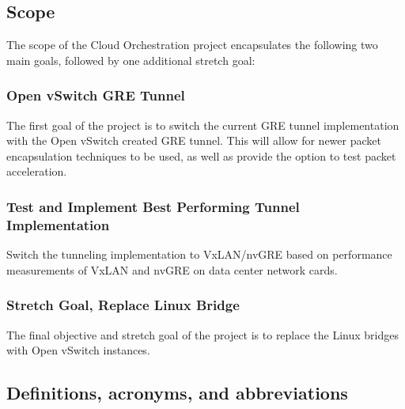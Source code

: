 \documentclass[10pt,letterpaper,onecolumn,draftclsnofoot]{IEEEtran}
\begin{document}
\subsection{Scope}

The scope of the Cloud Orchestration project encapsulates the following two main goals, followed
by one additional stretch goal:

\subsubsection{Open vSwitch GRE Tunnel}

The first goal of the project is to switch the current GRE tunnel implementation with the Open vSwitch
created GRE tunnel. This will allow for newer packet encapsulation techniques to be used, as
well as provide the option to test packet acceleration.

\subsubsection{Test and Implement Best Performing Tunnel Implementation}

Switch the tunneling implementation to VxLAN/nvGRE based on performance measurements of VxLAN and nvGRE
on data center network cards.

\subsubsection{Stretch Goal, Replace Linux Bridge}

The final objective and stretch goal of the project is to replace the Linux bridges with Open
vSwitch instances.


\subsection{Definitions, acronyms, and abbreviations}
\end{document}
